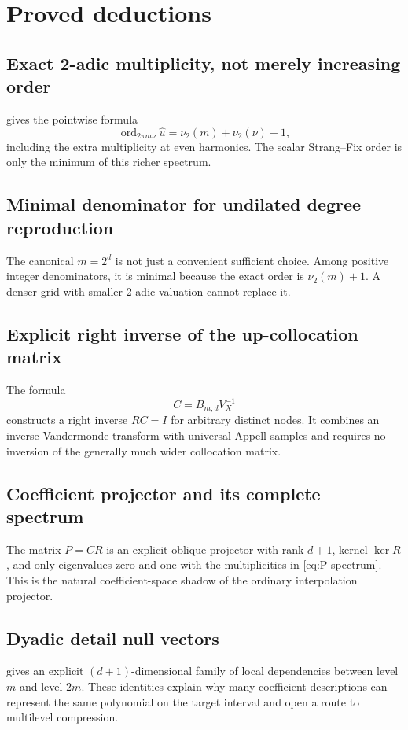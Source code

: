 \documentclass[11pt,oneside]{book}
\theoremstyle{definition}
\theoremstyle{remark}
\DeclareMathOperator{\ord}{ord}
\newcommand{\vtwo}{\nu_2}
\begin{document}
\section{Proved deductions}
\subsection{Exact 2-adic multiplicity, not merely increasing order}
 gives the pointwise formula
\[
 \ord_{2\pi m\nu}\widehat u=\vtwo(m)+\vtwo(\nu)+1,
\]
including the extra multiplicity at even harmonics.  The scalar Strang--Fix order is only the minimum of this richer spectrum.

\subsection{Minimal denominator for undilated degree reproduction}
The canonical \(m=2^d\) is not just a convenient sufficient choice.  Among positive integer denominators, it is minimal because the exact order is \(\vtwo(m)+1\).  A denser grid with smaller 2-adic valuation cannot replace it.

\subsection{Explicit right inverse of the up-collocation matrix}
The formula
\[
 C=B_{m,d}V_X^{-1}
\]
constructs a right inverse \(RC=I\) for arbitrary distinct nodes.  It combines an inverse Vandermonde transform with universal Appell samples and requires no inversion of the generally much wider collocation matrix.

\subsection{Coefficient projector and its complete spectrum}
The matrix \(P=CR\) is an explicit oblique projector with rank \(d+1\), kernel \(\ker R\), and only eigenvalues zero and one with the multiplicities in \cref{eq:P-spectrum}.  This is the natural coefficient-space shadow of the ordinary interpolation projector.

\subsection{Dyadic detail null vectors}
 gives an explicit \((d+1)\)-dimensional family of local dependencies between level \(m\) and level \(2m\).  These identities explain why many coefficient descriptions can represent the same polynomial on the target interval and open a route to multilevel compression.
\end{document}
